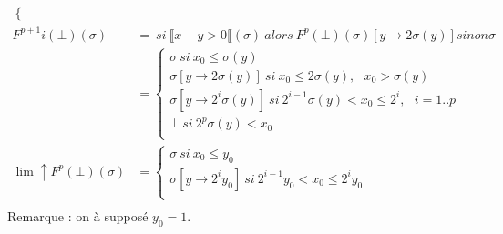 \documentclass[11pt,a4paper]{article}
\newcommand{\llbr}{\llbracket}
\begin{document}
\begin{align*}
\begin{cases}
						 \end{cases}\\
 	F^{p+1}i(\bot)(\sigma) &=\ si\ \llbr x - y > 0 \llbr(\sigma)\ alors\ F^p(\bot)(\sigma)[y \to 2 \sigma (y)] sinon \sigma\\
 	&= \begin{cases}
		 \sigma\ si\ x_0 \leqslant \sigma(y)\\
		 \sigma[y \to 2 \sigma(y)]\ si\ x_0 \leqslant 2 \sigma(y), \ \ \ x_0 > \sigma(y)\\
		 \sigma [y \to 2^i \sigma(y)]\ si\ 2^{i - 1}\sigma(y) < x_0 \leqslant 2^i,\ \ \ i = 1 .. p\\
		 \bot\ si\ 2^{p} \sigma(y) < x_0\\
 	   \end{cases}\\
 	\lim \uparrow F^p(\bot)(\sigma) &= \begin{cases}
									 		\sigma\ si\ x_0 \leqslant y_0\\
									 		\sigma[y \to 2^i y_0]\ si\ 2^{i-1} y_0 < x_0 \leqslant 2^i y_0\\
									 	\end{cases}\\
	\end{align*}
	Remarque : on à supposé $y_0 = 1$.
\end{document}
